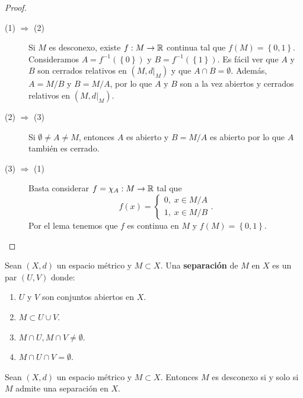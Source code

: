 \begin{proof}
\begin{description}
	\item[(1) $\displaystyle \Rightarrow $ (2)] Si $\displaystyle M $ es desconexo, existe $\displaystyle f : M \to \mathbb{R} $ continua tal que $\displaystyle f\left(M\right) = \left\{ 0,1\right\}  $. Consideramos $\displaystyle A = f^{-1}\left( \left\{ 0\right\} \right) $ y $\displaystyle B = f^{-1}\left( \left\{ 1\right\} \right) $. Es fácil ver que $\displaystyle A $ y $\displaystyle B $ son cerrados relativos en $\displaystyle \left(M, d|_{M}\right) $ y que $\displaystyle A \cap B= \emptyset $. Además, $\displaystyle A = M/B $ y $\displaystyle B = M/A $, por lo que $\displaystyle A $ y $\displaystyle B $ son a la vez abiertos y cerrados relativos en $\displaystyle \left(M, d|_{M}\right) $. 
	\item[(2) $\Rightarrow$ (3)] Si $\displaystyle \emptyset \neq A \neq M $, entonces $\displaystyle A $ es abierto y $\displaystyle B = M / A $ es abierto por lo que $\displaystyle A $ también es cerrado. 
	\item[(3) $\displaystyle \Rightarrow $ (1)] Basta considerar $\displaystyle f = \chi_{A} : M \to \mathbb{R} $ tal que 
		\[f\left(x\right) = 
		\begin{cases}
		0, \; x \in M / A \\
		1, \; x \in M / B
		\end{cases}
		.\]
		Por el lema tenemos que $\displaystyle f $ es continua en $\displaystyle M $ y $\displaystyle f\left(M\right) = \left\{ 0,1\right\}  $. 		
\end{description}
\end{proof}
\begin{definition}[Separación]
Sean $\displaystyle \left(X,d\right) $ un espacio métrico y $\displaystyle M \subset X $. Una \textbf{separación} de $\displaystyle M $ en $\displaystyle X $ es un par $\displaystyle \left(U,V\right) $ donde:
\begin{enumerate}
\item $\displaystyle U $ y $\displaystyle V $ son conjuntos abiertos en $\displaystyle X $.
\item $\displaystyle M \subset U \cup V $. 
\item $\displaystyle M \cap U, M \cap V \neq \emptyset $. 
\item $\displaystyle M \cap U \cap V = \emptyset$.
\end{enumerate}
\end{definition}
\begin{theorem}
Sean $\displaystyle \left(X,d\right) $ un espacio métrico y $\displaystyle M \subset X $. Entonces $\displaystyle M $ es desconexo si y solo si $\displaystyle M $ admite una separación en $\displaystyle X $.
\end{theorem}
